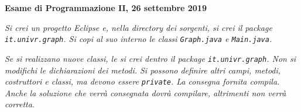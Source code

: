 \documentclass[12pt]{article}
\begin{document}
\begin{center} {\bf Esame di Programmazione II, 26 settembre 2019}\end{center}

\emph{
Si crei un progetto Eclipse e, nella directory dei sorgenti,
si crei il package \texttt{it.univr.graph}. Si copi al suo interno
le classi \texttt{Graph.java} e \texttt{Main.java}.
}

\emph{
Se si realizzano nuove classi, le si crei dentro
il package \texttt{it.univr.graph}.
Non si modifichi le dichiarazioni dei metodi. Si possono definire altri campi,
metodi, costruttori e classi, ma devono essere \texttt{private}.
La consegna fornita compila.
Anche la soluzione che verr\`a consegnata dovr\`a compilare,
altrimenti non verr\`a corretta.
}
\mbox{}\\
\end{document}

